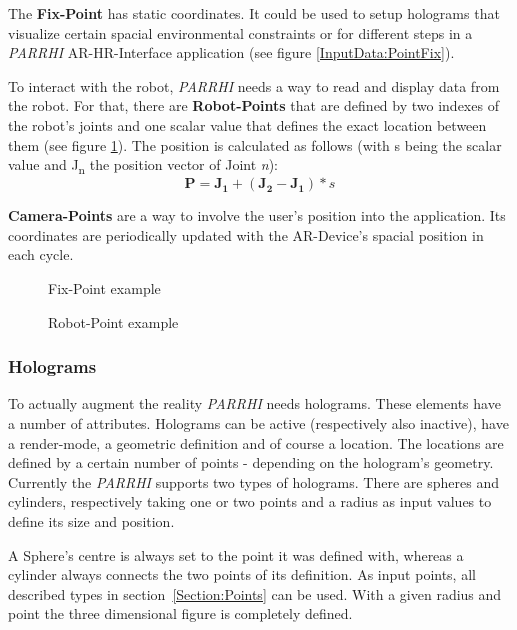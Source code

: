 The \textbf{Fix-Point} has static coordinates. It could be used to setup holograms that visualize certain spacial environmental constraints or for different steps in a \textit{PARRHI} AR-HR-Interface application (see figure \ref{InputData:PointFix}).

To interact with the robot, \textit{PARRHI} needs a way to read and display data from the robot. For that, there are \textbf{Robot-Points} that are defined by two indexes of the robot's joints and one scalar value that defines the exact location between them (see figure \ref{InputData:PointRobot}). The position is calculated as follows (with s being the scalar value and J\textsubscript{n} the position vector of Joint \textit{n}):
\begin{equation}
\boldsymbol{P} = \boldsymbol{J_1} + (\boldsymbol{J_2}-\boldsymbol{J_1}) * s
\end{equation}

\textbf{Camera-Points} are a way to involve the user's position into the application. Its coordinates are periodically updated with the AR-Device's spacial position in each cycle.


\begin{figure}
	\begin{minipage}{0.45\textwidth}
		\centering
		
		\caption{Fix-Point example}
		\label{InputData:PointFix}
	\end{minipage}\hfill
	\begin{minipage}{0.45\textwidth}
		\centering
		
		\caption{Robot-Point example}
		\label{InputData:PointRobot}
	\end{minipage}
\end{figure}


\subsubsection{Holograms}\label{Section:Holograms}
To actually augment the reality \textit{PARRHI} needs holograms. These elements have a number of attributes. Holograms can be active (respectively also inactive), have a render-mode, a geometric definition and of course a location. The locations are defined by a certain number of points - depending on the hologram's geometry. Currently the \textit{PARRHI} supports two types of holograms. There are spheres and cylinders, respectively taking one or two points and a radius as input values to define its size and position.

A Sphere's centre is always set to the point it was defined with, whereas a cylinder always connects the two points of its definition. As input points, all described types in section~\ref{Section:Points} can be used. With a given radius and point the three dimensional figure is completely defined.

